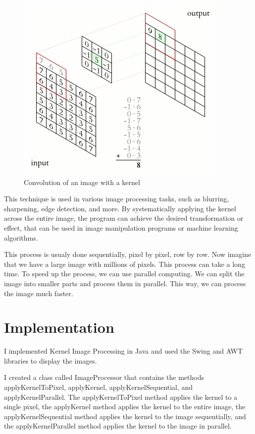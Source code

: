 \documentclass{article}
\begin{document}
\begin{multicols}{2}
    \begin{figure}[H]
        \centering
        \includegraphics[width=\linewidth]{img/kernel.jpg}
        \caption{Convolution of an image with a kernel}
        \label{fig:Kernel}
    \end{figure}

    This technique is used in various image processing tasks, such as blurring, sharpening, edge detection, and more. By systematically applying the kernel across the entire image, the program can achieve the desired transformation or effect, that can be used in image manipulation programs or machine learning algorithms.

    This process is usualy done sequentially, pixel by pixel, row by row. Now imagine that we have a large image with millions of pixels. This process can take a long time. To speed up the process, we can use parallel computing. We can split the image into smaller parts and process them in parallel. This way, we can process the image much faster.

    \section{Implementation}
    I implemented Kernel Image Processing in Java and used the Swing and AWT libraries to display the images.

    I created a class called ImageProcessor that contains the methods applyKernelToPixel, applyKernel, applyKernelSequential, and applyKernelParallel. The applyKernelToPixel method applies the kernel to a single pixel, the applyKernel method applies the kernel to the entire image, the applyKernelSequential method applies the kernel to the image sequentially, and the applyKernelParallel method applies the kernel to the image in parallel.


\end{multicols}
\end{document}
